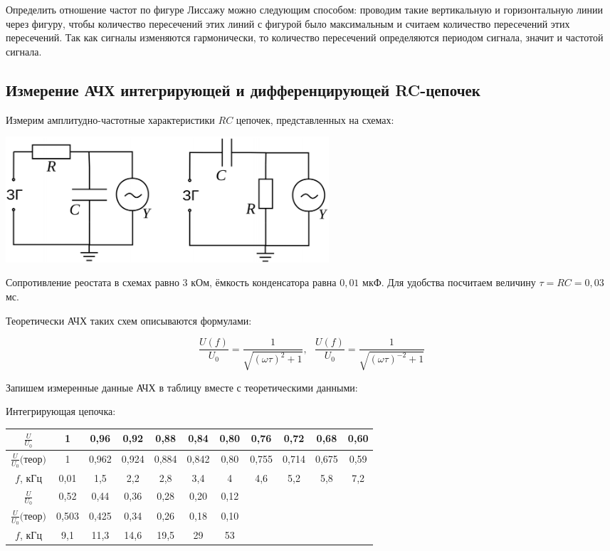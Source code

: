 \documentclass[a4paper, 12pt]{article} %
\begin{document}
Определить отношение частот по фигуре Лиссажу можно следующим способом: проводим такие вертикальную и горизонтальную линии через фигуру, чтобы количество пересечений этих линий с фигурой было максимальным и считаем количество пересечений этих пересечений. Так как сигналы изменяются гармонически, то количество пересечений определяются периодом сигнала, значит и частотой сигнала.\\

\text{ }

\subsection{Измерение АЧХ интегрирующей и дифференцирующей RC-цепочек}

Измерим амплитудно-частотные характеристики $RC$ цепочек, представленных на схемах:

\begin{center}
    \includegraphics[width=12cm]{12}
\end{center}

Сопротивление реостата в схемах равно $3$ кОм, ёмкость конденсатора равна $0,01$ мкФ. Для удобства посчитаем величину $\tau = RC = 0,03$ мс. 

Теоретически АЧХ таких схем описываются формулами:

\[\frac{U(f)}{U_0} = \frac{1}{\sqrt{(\omega \tau)^2 + 1}},\text{ } \frac{U(f)}{U_0} = \frac{1}{\sqrt{(\omega \tau)^{-2} + 1}}\]

Запишем измеренные данные АЧХ в таблицу вместе с теоретическими данными:

Интегрирующая цепочка:
\begin{center}
\begin{tabular}{|c|c|c|c|c|c|c|c|c|c|c|}
 \hline 
 $\frac{U}{U_0}$ & 1 & 0,96 & 0,92 & 0,88 & 0,84 & 0,80 & 0,76 & 0,72 & 0,68 & 0,60\\ 
 \hline 
 $\frac{U}{U_0} \text{(теор)}$ & 1 & 0,962 & 0,924 & 0,884 & 0,842 & 0,80 & 0,755 & 0,714 & 0,675 & 0,59\\
 \hline 
 $f$, кГц & 0,01 & 1,5 & 2,2 & 2,8 & 3,4 & 4 & 4,6 & 5,2 & 5,8 & 7,2 \\ 
 \hline 
 $\frac{U}{U_0}$  & 0,52 & 0,44 & 0,36 & 0,28 & 0,20 & 0,12 &&&&  \\ 
 \hline 
 $\frac{U}{U_0} \text{(теор)}$  & 0,503 & 0,425 & 0,34 & 0,26 & 0,18 & 0,10 &&&&  \\ 
 \hline 
 $f$, кГц & 9,1 & 11,3 & 14,6 & 19,5 & 29 & 53 &&&& \\ 
 \hline 
\end{tabular}
\end{center}
 
\end{document}
